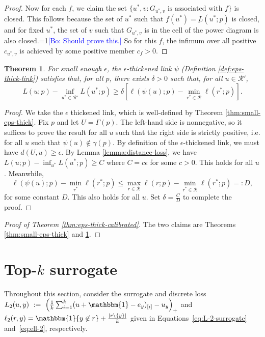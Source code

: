 \documentclass[12pt]{article}
\newcommand{\Comments}{1}
\newcommand{\mynote}[2]{\ifnum\Comments=1\textcolor{#1}{#2}\fi}
\newcommand{\bo}[1]{\mynote{blue}{[Bo: #1]}}
\newcommand{\R}{\mathcal{R}}
\newcommand{\ones}{\mathbbm{1}}
\newcommand{\Ind}[1]{\ones\{#1\}}
\newtheorem{theorem}{Theorem}
\begin{document}
\begin{proof}
  Now for each $f$, we claim the set $\{u^*, v : \text{$G_{u^*,v}$ is associated with $f$}\}$ is closed.
  This follows because the set of $u^*$ such that $f(u^*) = \underbar{L}(u^*;p)$ is closed, and for fixed $u^*$, the set of $v$ such that $G_{u^*,v}$ is in the cell of the power diagram is also closed.\bo{Should prove this.}
  So for this $f$, the infimum over all positive $c_{u^*,v}$ is achieved by some positive member $c_f > 0$.
\end{proof}

\begin{theorem} \label{thm:app-eps-thick-sep}
  For small enough $\epsilon$, the $\epsilon$-thickened link $\psi$ (Definition \ref{def:eps-thick-link}) satisfies that, for all $p$, there exists $\delta > 0$ such that, for all $u \in \R'$,
    \[ L(u;p) - \inf_{u^* \in \R'} L(u^*;p) \geq \delta \left[ \ell(\psi(u);p) - \min_{r^* \in \R} \ell(r^*;p) \right] . \]
\end{theorem}
\begin{proof}
  We take the $\epsilon$ thickened link, which is well-defined by Theorem \ref{thm:small-eps-thick}.
  Fix $p$ and let $U = \Gamma(p)$.
  The left-hand side is nonnegative, so it suffices to prove the result for all $u$ such that the right side is strictly positive, i.e. for all $u$ such that $\psi(u) \not\in \gamma(p)$.
  By definition of the $\epsilon$-thickened link, we must have $d(U,u) \geq \epsilon$.
  By Lemma \ref{lemma:distance-loss}, we have $L(u;p) - \inf_{u^*} L(u^*;p) \geq C$ where $C = c\epsilon$ for some $c > 0$.
  This holds for all $u$.
  Meanwhile,
    \[ \ell(\psi(u);p) - \min_{r^*} \ell(r^*;p) \leq \max_{r \in \R} \ell(r;p) - \min_{r^* \in \R} \ell(r^*;p) =: D, \]
  for some constant $D$.
  This also holds for all $u$.
  Set $\delta = \frac{C}{D}$ to complete the proof.
\end{proof}

\begin{proof}[Proof of Theorem \ref{thm:eps-thick-calibrated}]
  The two claims are Theorems \ref{thm:small-eps-thick} and \ref{thm:app-eps-thick-sep}.
\end{proof}


\section{Top-$k$ surrogate}
Throughout this section, consider the surrogate and discrete loss $L_2(u,y)~:=~\left(\frac{1}{k} \sum_{i=1}^k (u + \ones - e_y)_{[i]} - u_y \right)_+$ and $\ell_2(r,y) = \Ind{y \not\in r} + \frac{|r \setminus \{y\}|}{k}$ given in Equations~\ref{eq:L-2-surrogate} and~\ref{eq:ell-2}, respectively.
\end{document}
